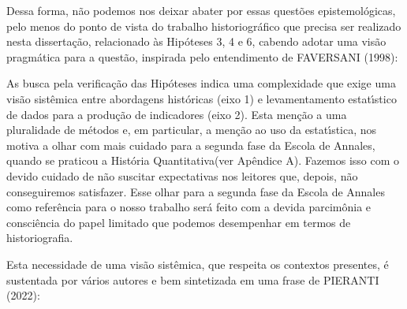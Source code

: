 \documentclass[
12pt,		%
openright,	%
twoside,  %
a4paper,			%
chapter=TITLE,		%
english,			%
french,				%
spanish,			%
brazil				%
]{USPSC-classe/USPSC}
\begin{document}
Dessa forma, n\~ao podemos nos deixar abater por essas quest\~oes epistemol\'ogicas, pelo menos do ponto de vista do trabalho historiogr\'afico que precisa ser realizado nesta disserta\c{c}\~ao, relacionado \`as Hip\'oteses 3, 4 e 6, cabendo adotar uma vis\~ao pragm\'atica para a quest\~ao, inspirada pelo entendimento de FAVERSANI (1998):











\noindent\begin{center}\mbox{\centering{}}\end{center}


As busca pela verifica\c{c}\~ao das Hip\'oteses indica uma complexidade que exige uma vis\~ao sist\^emica entre abordagens hist\'oricas (eixo 1) e levamentamento estat\'{\i}stico de dados para a produ\c{c}\~ao de indicadores (eixo 2). Esta men\c{c}\~ao a uma pluralidade de m\'etodos e, em particular, a men\c{c}\~ao ao uso da estat\'{\i}stica, nos motiva a olhar com mais cuidado para a segunda fase da Escola de Annales, quando se praticou a \textquotedbl Hist\'oria Quantitativa\textquotedbl  (ver Ap\^endice A). Fazemos isso com o devido cuidado de n\~ao suscitar expectativas nos leitores que, depois, n\~ao conseguiremos satisfazer. Esse olhar para a segunda fase da Escola de Annales como refer\^encia para o nosso trabalho ser\'a feito com a devida parcim\^onia e consci\^encia do papel limitado que podemos desempenhar em termos de historiografia.










Esta necessidade de uma vis\~ao sist\^emica, que respeita os contextos presentes, \'e sustentada por v\'arios autores e bem sintetizada em uma frase de PIERANTI (2022):
\end{document}
